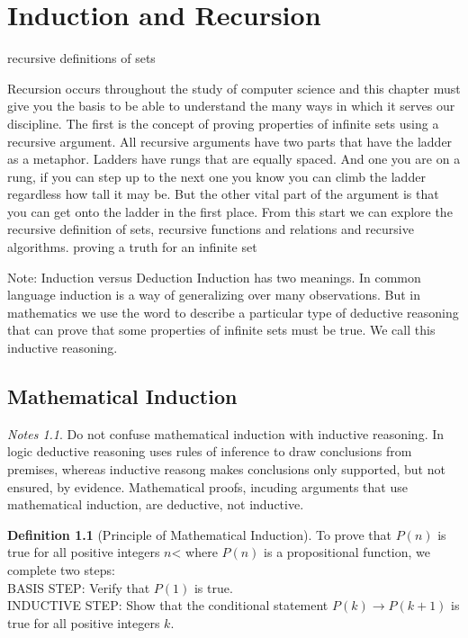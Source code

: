 \documentclass[11pt]{book} %
\theoremstyle {definition}
\newtheorem {definition}{Definition}[section]
\theoremstyle {remark}
\newtheorem*{notes}{Notes}
\begin{document}
\newpage



\chapter {Induction and Recursion}
recursive definitions of sets

Recursion occurs throughout the study of computer science and this chapter must give you the basis to be able to understand the many ways in which it serves our discipline. The first is the concept of proving properties of infinite sets using a recursive argument. All recursive arguments have two parts that have the ladder as a metaphor. Ladders have rungs that are equally spaced. And one you are on a rung, if you can step up to the next one you know you can climb the ladder regardless how tall it may be. But the other vital part of the argument is that you can get onto the ladder in the first place. From this start we can explore the recursive definition of sets, recursive functions and relations and recursive algorithms. 
proving a truth for an infinite set


Note: Induction versus Deduction
Induction has two meanings. In common language induction is a way of generalizing over many observations. But in mathematics we use the word to describe a particular type of deductive reasoning that can prove that some properties of infinite sets must be true. We call this inductive reasoning. 



\section {Mathematical Induction}
\begin{notes}
Do not confuse mathematical induction with inductive reasoning. In logic deductive reasoning uses rules of inference to draw conclusions from premises, whereas inductive reasong makes conclusions only supported, but not ensured, by evidence. Mathematical proofs, incuding arguments that use mathematical induction, are deductive, not inductive.
\end{notes}

\begin{definition}[Principle of Mathematical Induction]
To prove that $P(n)$ is true for all positive integers $n$< where $P(n)$ is a propositional function, we complete two steps: \\
BASIS STEP: Verify that $P(1)$ is true.\\
INDUCTIVE STEP: Show that the conditional statement $P(k) \rightarrow P(k+1)$ is true for all positive integers $k$.
\end{definition}
 
\end{document}
